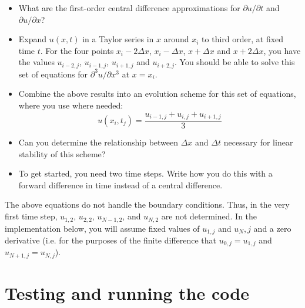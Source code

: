\documentclass[11pt, preprint]{aastex}
\begin{document}
\begin{itemize}
\item What are the first-order central difference approximations for
  $\partial u/\partial t$ and $\partial u/\partial x$?
\item Expand $u(x,t)$ in a Taylor series in $x$ around $x_i$ to third
  order, at fixed time $t$.  For the four points $x_i - 2 \Delta x$,
  $x_i - \Delta x$, $x+\Delta x$ and $x+2 \Delta x$, you have the
  values $u_{i-2,j}$, $u_{i-1,j}$, $u_{i+1, j}$ and $u_{i+2, j}$.  You
  should be able to solve this set of equations for $\partial^3 u /
  \partial x^3$ at $x=x_i$.
\item Combine the above results into an evolution scheme for this set
  of equations, where you use where needed:
\begin{equation}
 u(x_i, t_j) = \frac{u_{i-1, j} + u_{i,j} + u_{i+1,j}}{3}
\end{equation}
\item Can you determine the relationship between $\Delta x$ and
  $\Delta t$ necessary for linear stability of this scheme?
\item To get started, you need two time steps. Write how you do this
  with a forward difference in time instead of a central difference.
\end{itemize}

The above equations do not handle the boundary conditions. Thus, in
the very first time step, $u_{1,2}$, $u_{2,2}$, $u_{N-1, 2}$, and
$u_{N, 2}$ are not determined. In the implementation below, you will
assume fixed values of $u_{1, j}$ and $u_N, j$ and a zero derivative
(i.e. for the purposes of the finite difference that $u_{0, j} =
u_{1,j}$ and $u_{N+1, j} = u_{N,j}$).

\section{Testing and running the code}
\end{document}
